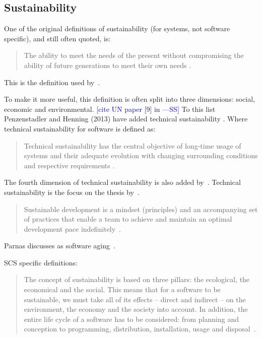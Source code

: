 \documentclass[letterpaper,cleveref]{lipics-v2019}
\newcommand{\authornote}[3]{\textcolor{#1}{[#3 ---#2]}}
\newcommand{\authornote}[3]{}
\newcommand{\wss}[1]{\authornote{blue}{SS}{#1}} %
\begin{document}
\subsection{Sustainability}

One of the original definitions of sustainability (for systems, not software
specific), and still often quoted, is:

\begin{quotation}
\noindent The ability to meet the needs of the present without compromising the ability of
future generations to meet their own needs \cite{Brundtland1987}.
\end{quotation}

This is the definition used by~\cite{IISD2019}.

To make it more useful, this definition is often split into three dimensions:
social, economic and environmental. \wss{cite UN paper [9] in
  \cite{PenzenstadlerAndHenning2013}}  To this list Penzenstadler and Henning
(2013) have added technical sustainability \cite{PenzenstadlerAndHenning2013}.
Where technical sustainability for software is defined as:

\begin{quotation}
\noindent Technical sustainability has the central objective of long-time
usage of systems and their adequate evolution with changing surrounding
conditions and respective requirements \cite{PenzenstadlerAndHenning2013}.
\end{quotation}

The fourth dimension of technical sustainability is also added
by~\cite{WolframEtAl2017}.  Technical sustainability is the focus on the thesis
by~\cite{Hygerth2016}.

\begin{quotation}
  \noindent Sustainable development is a mindset (principles) and an
  accompanying set of practices that enable a team to achieve and maintain an
  optimal development pace indefinitely~\cite{Tate2005}.
\end{quotation}

Parnas discusses as software aging~\cite{Parnas1994a}.

SCS specific definitions:

\begin{quotation}
  \noindent The concept of sustainability is based on three pillars: the
  ecological, the economical and the social. This means that for a software to
  be sustainable, we must take all of its effects -- direct and indirect -- on
  the environment, the economy and the society into account. In addition, the
  entire life cycle of a software has to be considered: from planning and
  conception to programming, distribution, installation, usage and
  disposal~\cite{Heine2017}.
\end{quotation}
\end{document}
